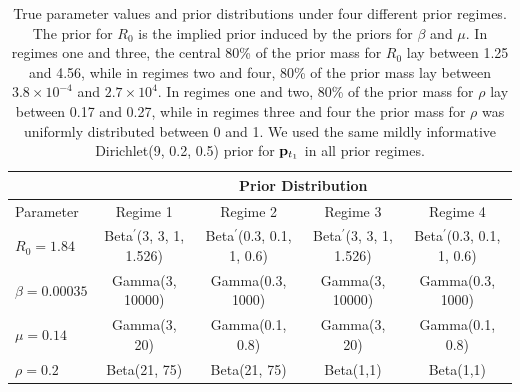 \begin{table}[htbp]
	\centering	
	\footnotesize
	\begin{tabular}{lcccc}
		\hline & \multicolumn{4}{c}{Prior Distribution} \\
		\hline
		Parameter & Regime 1 & Regime 2 & Regime 3 & Regime 4\\
		\hline
		$R_0 = 1.84$ & Beta$ ^\prime $(3, 3, 1, 1.526) & Beta$ ^\prime $(0.3, 0.1, 1, 0.6) & Beta$ ^\prime $(3, 3, 1, 1.526) & Beta$ ^\prime $(0.3, 0.1, 1, 0.6) \\
		$\beta = 0.00035$ & Gamma(3, 10000) & Gamma(0.3, 1000) & Gamma(3, 10000)& Gamma(0.3, 1000) \\
		$\mu = 0.14$ & Gamma(3, 20) & Gamma(0.1, 0.8) & Gamma(3, 20)& Gamma(0.1, 0.8)  \\
		$\rho = 0.2$ & Beta(21, 75) & Beta(21, 75) & Beta(1,1) & Beta(1,1)\\
		\hline 
	\end{tabular} 
	\caption[Simulation 4 prior regimes.]{True parameter values and prior distributions under four different prior regimes. The prior for $ R_0 $ is the implied prior induced by the priors for $ \beta $ and $ \mu $. In regimes one and three, the central 80\% of the prior mass for $ R_0 $ lay between 1.25 and 4.56, while in regimes two and four, 80\% of the prior mass lay between $ 3.8\times10^{-4} $ and $ 2.7\times 10^4 $. In regimes one and two, 80\% of the prior mass for $ \rho $ lay between 0.17 and 0.27, while in regimes three and four the prior mass for $ \rho $ was uniformly distributed between 0 and 1. We used the same mildly informative Dirichlet(9, 0.2, 0.5) prior for $ \mathbf{p}_{t_1} $ in all prior regimes.}
	\label{tab:prior_effect_priors}
\end{table}

